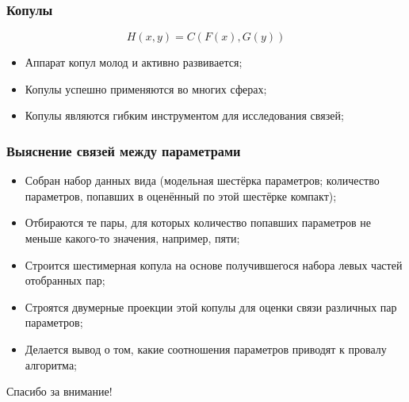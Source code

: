 \documentclass[11pt]{beamer}
\begin{document}
\begin{frame}
\begin{center}
\frametitle{Копулы}
\begin{equation}
H(x, y) = C(F(x), G(y))
\end{equation}
\begin{itemize}
  \item Аппарат копул молод и активно развивается;
  \item Копулы успешно применяются во многих сферах;
  \item Копулы являются гибким инструментом для исследования связей;
\end{itemize}
\end{center}
\end{frame}

\begin{frame}
\begin{center}
\frametitle{Выяснение связей между параметрами}
\begin{itemize}
  \item Собран набор данных вида (модельная шестёрка параметров; количество параметров, попавших в оценённый по этой шестёрке компакт);
  \item Отбираются те пары, для которых количество попавших параметров не меньше какого-то значения, например, пяти;
  \item Строится шестимерная копула на основе получившегося набора левых частей отобранных пар;
  \item Строятся двумерные проекции этой копулы для оценки связи различных пар параметров;
  \item Делается вывод о том, какие соотношения параметров приводят к провалу алгоритма;
\end{itemize}
\end{center}
\end{frame}


\begin{frame}
\begin{center}
Спасибо за внимание!
\end{center}
\end{frame}
\end{document}
